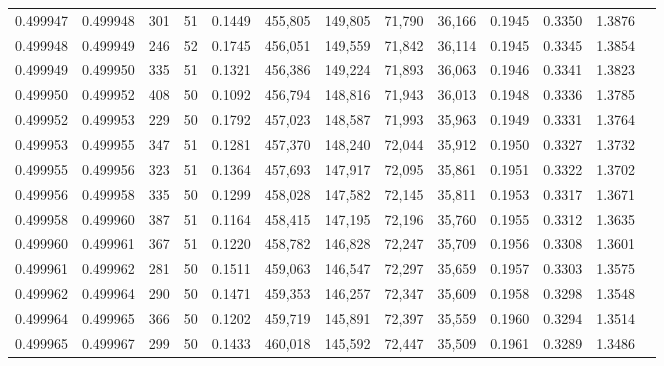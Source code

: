 \begin{tabular}{rrrrrrrrrrrrr}
0.499947 & 0.499948 & 301 &  51 &                                     0.1449 & 455,805 & 149,805 &  71,790 &  36,166 & 0.1945 & 0.3350 & 1.3876 \\
0.499948 & 0.499949 & 246 &  52 &                                     0.1745 & 456,051 & 149,559 &  71,842 &  36,114 & 0.1945 & 0.3345 & 1.3854 \\
0.499949 & 0.499950 & 335 &  51 &                                     0.1321 & 456,386 & 149,224 &  71,893 &  36,063 & 0.1946 & 0.3341 & 1.3823 \\
0.499950 & 0.499952 & 408 &  50 &                                     0.1092 & 456,794 & 148,816 &  71,943 &  36,013 & 0.1948 & 0.3336 & 1.3785 \\
0.499952 & 0.499953 & 229 &  50 &                                     0.1792 & 457,023 & 148,587 &  71,993 &  35,963 & 0.1949 & 0.3331 & 1.3764 \\
0.499953 & 0.499955 & 347 &  51 &                                     0.1281 & 457,370 & 148,240 &  72,044 &  35,912 & 0.1950 & 0.3327 & 1.3732 \\
0.499955 & 0.499956 & 323 &  51 &                                     0.1364 & 457,693 & 147,917 &  72,095 &  35,861 & 0.1951 & 0.3322 & 1.3702 \\
0.499956 & 0.499958 & 335 &  50 &                                     0.1299 & 458,028 & 147,582 &  72,145 &  35,811 & 0.1953 & 0.3317 & 1.3671 \\
0.499958 & 0.499960 & 387 &  51 &                                     0.1164 & 458,415 & 147,195 &  72,196 &  35,760 & 0.1955 & 0.3312 & 1.3635 \\
0.499960 & 0.499961 & 367 &  51 &                                     0.1220 & 458,782 & 146,828 &  72,247 &  35,709 & 0.1956 & 0.3308 & 1.3601 \\
0.499961 & 0.499962 & 281 &  50 &                                     0.1511 & 459,063 & 146,547 &  72,297 &  35,659 & 0.1957 & 0.3303 & 1.3575 \\
0.499962 & 0.499964 & 290 &  50 &                                     0.1471 & 459,353 & 146,257 &  72,347 &  35,609 & 0.1958 & 0.3298 & 1.3548 \\
0.499964 & 0.499965 & 366 &  50 &                                     0.1202 & 459,719 & 145,891 &  72,397 &  35,559 & 0.1960 & 0.3294 & 1.3514 \\
0.499965 & 0.499967 & 299 &  50 &                                     0.1433 & 460,018 & 145,592 &  72,447 &  35,509 & 0.1961 & 0.3289 & 1.3486 \\

\end{tabular}
